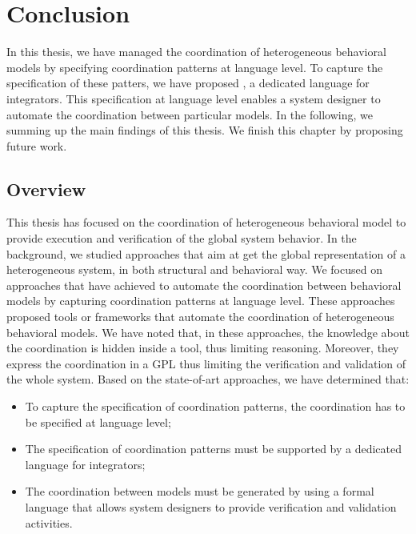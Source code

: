 \chapter{Conclusion}
\label{ch:conclusions}
In this thesis, we have managed the coordination of heterogeneous behavioral models by specifying coordination patterns at language level. To capture the specification of these patters, we have proposed \bcool, a dedicated language for integrators. This specification at language level enables a system designer to automate the coordination between particular models. In the following, we summing up the main findings of this thesis. We finish this chapter by proposing future work.    

\section{Overview}
	
	
This thesis has focused on the coordination of heterogeneous behavioral model to provide execution and verification of the global system behavior. In the background, we studied approaches that aim at get the global representation of a heterogeneous system, in both structural and behavioral way. We focused on approaches that have achieved to automate the coordination between behavioral models by capturing coordination patterns at language level. These approaches proposed tools or frameworks that automate the coordination of heterogeneous behavioral models. We have noted that, in these approaches, the knowledge about the coordination is hidden inside a tool, thus limiting reasoning. Moreover, they express the coordination in a GPL thus limiting the verification and validation of the whole system. Based on the state-of-art approaches, we have determined that:
	\begin{itemize}

	\item To capture the specification of coordination patterns, the coordination has to be specified at language level;
	 
	\item The specification of coordination patterns must be supported by a dedicated language for integrators; 
	 
	\item The coordination between models must be generated by using a formal language that allows system designers to provide verification and validation activities.
	
\end{itemize}
	  
